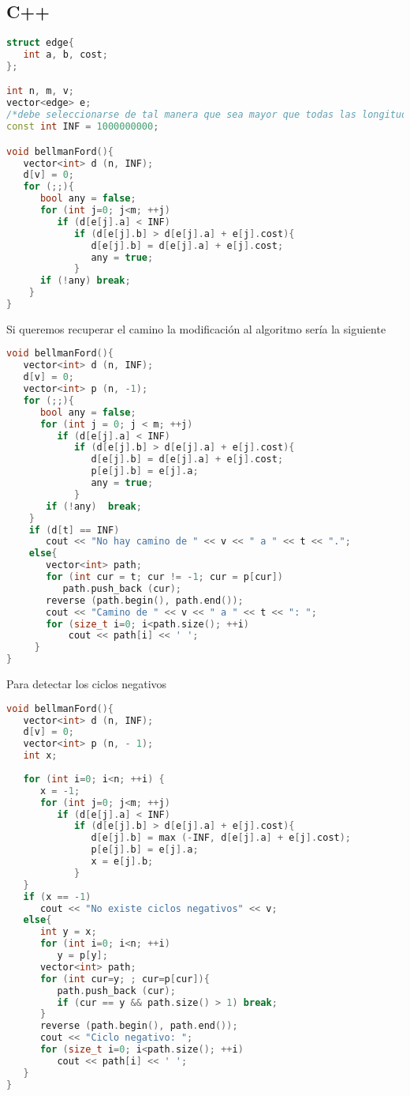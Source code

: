 \subsection{C++}
\begin{lstlisting}[language=C++]
struct edge{
   int a, b, cost;
};

int n, m, v;
vector<edge> e;
/*debe seleccionarse de tal manera que sea mayor que todas las longitudes de ruta posibles.*/
const int INF = 1000000000; 

void bellmanFord(){
   vector<int> d (n, INF);
   d[v] = 0;
   for (;;){
      bool any = false;
      for (int j=0; j<m; ++j)
         if (d[e[j].a] < INF)
            if (d[e[j].b] > d[e[j].a] + e[j].cost){
               d[e[j].b] = d[e[j].a] + e[j].cost;
               any = true;
            }
      if (!any) break;
    }
}
\end{lstlisting}

Si queremos recuperar el camino la modificación al algoritmo sería la siguiente

\begin{lstlisting}[language=C++]
void bellmanFord(){
   vector<int> d (n, INF);
   d[v] = 0;
   vector<int> p (n, -1);
   for (;;){
      bool any = false;
      for (int j = 0; j < m; ++j)
         if (d[e[j].a] < INF)
            if (d[e[j].b] > d[e[j].a] + e[j].cost){
               d[e[j].b] = d[e[j].a] + e[j].cost;
               p[e[j].b] = e[j].a;
               any = true;
            }
       if (!any)  break;
    }
	if (d[t] == INF)
	   cout << "No hay camino de " << v << " a " << t << ".";
	else{
       vector<int> path;
       for (int cur = t; cur != -1; cur = p[cur])
          path.push_back (cur);
       reverse (path.begin(), path.end());
	   cout << "Camino de " << v << " a " << t << ": ";
       for (size_t i=0; i<path.size(); ++i)
           cout << path[i] << ' ';
     }
}
\end{lstlisting}	

Para detectar los ciclos negativos

\begin{lstlisting}[language=C++]
void bellmanFord(){
   vector<int> d (n, INF);
   d[v] = 0;
   vector<int> p (n, - 1);
   int x;
   
   for (int i=0; i<n; ++i) {
      x = -1;
      for (int j=0; j<m; ++j)
         if (d[e[j].a] < INF)
            if (d[e[j].b] > d[e[j].a] + e[j].cost){
               d[e[j].b] = max (-INF, d[e[j].a] + e[j].cost);
               p[e[j].b] = e[j].a;
               x = e[j].b;
            }
   }
   if (x == -1)
      cout << "No existe ciclos negativos" << v;
   else{
      int y = x;
      for (int i=0; i<n; ++i)
         y = p[y];
      vector<int> path;
      for (int cur=y; ; cur=p[cur]){
         path.push_back (cur);
         if (cur == y && path.size() > 1) break;
      }
      reverse (path.begin(), path.end());
	  cout << "Ciclo negativo: ";
      for (size_t i=0; i<path.size(); ++i)
         cout << path[i] << ' ';
   }
}
\end{lstlisting}	

